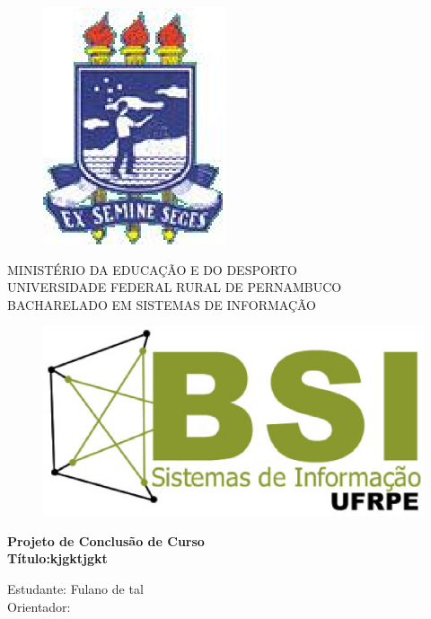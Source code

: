 \documentclass[a4paper,11pt]{article}
\begin{document}
\pagestyle {empty}


\vspace*{-2cm}
\begin{figure}[h]
\leavevmode
\begin{minipage}[t]{\textwidth}
\includegraphics[scale=0.7]{logo-ufrpe.eps}
\end{minipage}
\end{figure}

\vspace*{-3.0cm}
{\bf
\begin{center}
{
\hspace*{0cm} 	MINISTÉRIO DA EDUCAÇÃO E DO DESPORTO \\
\hspace*{.2in} UNIVERSIDADE FEDERAL RURAL DE PERNAMBUCO \\
\hspace*{.2in} BACHARELADO EM SISTEMAS DE INFORMAÇÃO} \\
\end{center}}
\vspace{0.0cm}
\noindent
\begin{figure}[h]
\centering
\includegraphics[scale=0.5]{Logo-bsi-presencial-v3-amp.eps}
\end{figure}
\vspace*{2.0cm}
\begin{center}


{\Large \bf  Projeto de Conclusão de Curso}\\[1cm]
{\Large \bf Título:kjgktjgkt} \\[3cm]
\end{center}
{\Large  Estudante: Fulano de tal}\\[6mm]
{\Large  Orientador: }\\[6mm]
\end{document}
